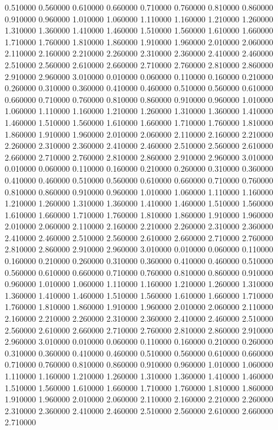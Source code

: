 0.510000
0.560000
0.610000
0.660000
0.710000
0.760000
0.810000
0.860000
0.910000
0.960000
1.010000
1.060000
1.110000
1.160000
1.210000
1.260000
1.310000
1.360000
1.410000
1.460000
1.510000
1.560000
1.610000
1.660000
1.710000
1.760000
1.810000
1.860000
1.910000
1.960000
2.010000
2.060000
2.110000
2.160000
2.210000
2.260000
2.310000
2.360000
2.410000
2.460000
2.510000
2.560000
2.610000
2.660000
2.710000
2.760000
2.810000
2.860000
2.910000
2.960000
3.010000
0.010000
0.060000
0.110000
0.160000
0.210000
0.260000
0.310000
0.360000
0.410000
0.460000
0.510000
0.560000
0.610000
0.660000
0.710000
0.760000
0.810000
0.860000
0.910000
0.960000
1.010000
1.060000
1.110000
1.160000
1.210000
1.260000
1.310000
1.360000
1.410000
1.460000
1.510000
1.560000
1.610000
1.660000
1.710000
1.760000
1.810000
1.860000
1.910000
1.960000
2.010000
2.060000
2.110000
2.160000
2.210000
2.260000
2.310000
2.360000
2.410000
2.460000
2.510000
2.560000
2.610000
2.660000
2.710000
2.760000
2.810000
2.860000
2.910000
2.960000
3.010000
0.010000
0.060000
0.110000
0.160000
0.210000
0.260000
0.310000
0.360000
0.410000
0.460000
0.510000
0.560000
0.610000
0.660000
0.710000
0.760000
0.810000
0.860000
0.910000
0.960000
1.010000
1.060000
1.110000
1.160000
1.210000
1.260000
1.310000
1.360000
1.410000
1.460000
1.510000
1.560000
1.610000
1.660000
1.710000
1.760000
1.810000
1.860000
1.910000
1.960000
2.010000
2.060000
2.110000
2.160000
2.210000
2.260000
2.310000
2.360000
2.410000
2.460000
2.510000
2.560000
2.610000
2.660000
2.710000
2.760000
2.810000
2.860000
2.910000
2.960000
3.010000
0.010000
0.060000
0.110000
0.160000
0.210000
0.260000
0.310000
0.360000
0.410000
0.460000
0.510000
0.560000
0.610000
0.660000
0.710000
0.760000
0.810000
0.860000
0.910000
0.960000
1.010000
1.060000
1.110000
1.160000
1.210000
1.260000
1.310000
1.360000
1.410000
1.460000
1.510000
1.560000
1.610000
1.660000
1.710000
1.760000
1.810000
1.860000
1.910000
1.960000
2.010000
2.060000
2.110000
2.160000
2.210000
2.260000
2.310000
2.360000
2.410000
2.460000
2.510000
2.560000
2.610000
2.660000
2.710000
2.760000
2.810000
2.860000
2.910000
2.960000
3.010000
0.010000
0.060000
0.110000
0.160000
0.210000
0.260000
0.310000
0.360000
0.410000
0.460000
0.510000
0.560000
0.610000
0.660000
0.710000
0.760000
0.810000
0.860000
0.910000
0.960000
1.010000
1.060000
1.110000
1.160000
1.210000
1.260000
1.310000
1.360000
1.410000
1.460000
1.510000
1.560000
1.610000
1.660000
1.710000
1.760000
1.810000
1.860000
1.910000
1.960000
2.010000
2.060000
2.110000
2.160000
2.210000
2.260000
2.310000
2.360000
2.410000
2.460000
2.510000
2.560000
2.610000
2.660000
2.710000
